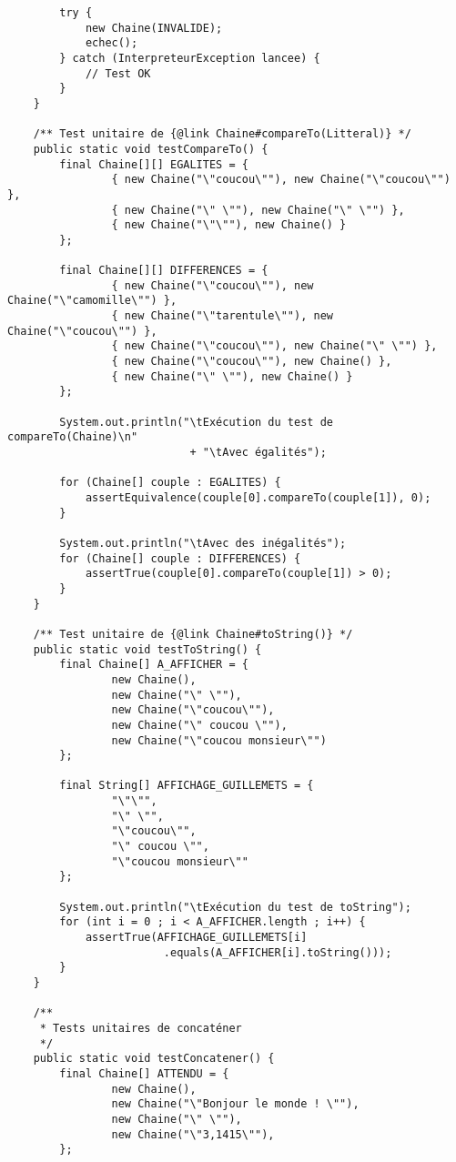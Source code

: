 \begin{enum}
\begin{verbatim}
        try {
            new Chaine(INVALIDE);
            echec();
        } catch (InterpreteurException lancee) {
            // Test OK
        }
    }

    /** Test unitaire de {@link Chaine#compareTo(Litteral)} */
    public static void testCompareTo() {
        final Chaine[][] EGALITES = { 
                { new Chaine("\"coucou\""), new Chaine("\"coucou\"") }, 
                { new Chaine("\" \""), new Chaine("\" \"") },
                { new Chaine("\"\""), new Chaine() } 
        };

        final Chaine[][] DIFFERENCES = { 
                { new Chaine("\"coucou\""), new Chaine("\"camomille\"") },
                { new Chaine("\"tarentule\""), new Chaine("\"coucou\"") }, 
                { new Chaine("\"coucou\""), new Chaine("\" \"") }, 
                { new Chaine("\"coucou\""), new Chaine() },
                { new Chaine("\" \""), new Chaine() } 
        };

        System.out.println("\tExécution du test de compareTo(Chaine)\n"
                            + "\tAvec égalités");

        for (Chaine[] couple : EGALITES) {
            assertEquivalence(couple[0].compareTo(couple[1]), 0);
        }

        System.out.println("\tAvec des inégalités");
        for (Chaine[] couple : DIFFERENCES) {
            assertTrue(couple[0].compareTo(couple[1]) > 0);
        }
    }

    /** Test unitaire de {@link Chaine#toString()} */
    public static void testToString() {
        final Chaine[] A_AFFICHER = {
                new Chaine(), 
                new Chaine("\" \""), 
                new Chaine("\"coucou\""),
                new Chaine("\" coucou \""), 
                new Chaine("\"coucou monsieur\"")
        };

        final String[] AFFICHAGE_GUILLEMETS = {
                "\"\"", 
                "\" \"", 
                "\"coucou\"", 
                "\" coucou \"",
                "\"coucou monsieur\""
        };

        System.out.println("\tExécution du test de toString");
        for (int i = 0 ; i < A_AFFICHER.length ; i++) {
            assertTrue(AFFICHAGE_GUILLEMETS[i]
                        .equals(A_AFFICHER[i].toString()));
        }
    }

    /**
     * Tests unitaires de concaténer
     */
    public static void testConcatener() {
        final Chaine[] ATTENDU = {
                new Chaine(),
                new Chaine("\"Bonjour le monde ! \""),
                new Chaine("\" \""),
                new Chaine("\"3,1415\""),
        };


\end{verbatim}
\end{enum}
